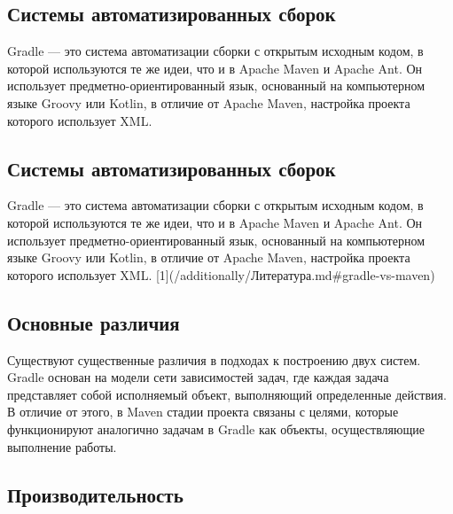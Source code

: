 \subsection{Системы автоматизированных сборок}

Gradle — это система автоматизации сборки с открытым исходным кодом, в которой используются те же
идеи, что и в Apache Maven и Apache Ant.
Он использует предметно-ориентированный язык, основанный на
компьютерном языке Groovy или Kotlin, в отличие от Apache Maven, настройка проекта которого
использует XML.

\subsection{Системы автоматизированных сборок}

Gradle — это система автоматизации сборки с открытым исходным кодом, в которой используются те же
идеи, что и в Apache Maven и Apache Ant.
Он использует предметно-ориентированный язык, основанный на
компьютерном языке Groovy или Kotlin, в отличие от Apache Maven, настройка проекта которого
использует XML.
[1](/additionally/Литература.md\#gradle-vs-maven)

\subsection{Основные различия}\label{subsec:-2}

Существуют существенные различия в подходах к построению двух систем.
Gradle основан на модели сети
зависимостей задач, где каждая задача представляет собой исполняемый объект, выполняющий
определенные действия.
В отличие от этого, в Maven стадии проекта связаны с целями, которые
функционируют аналогично задачам в Gradle как объекты, осуществляющие выполнение работы.

\subsection{Производительность}\label{subsec:2}

